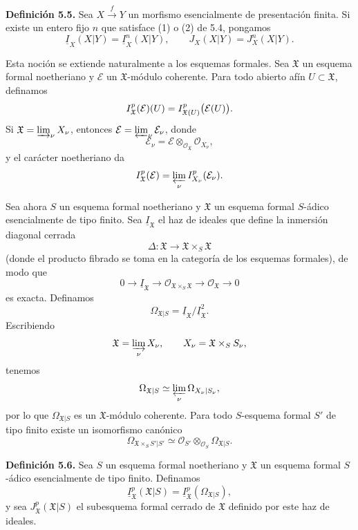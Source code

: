 \par\medskip
\noindent\textbf{Definición 5.5.}
Sea $X\xrightarrow{f}Y$ un morfismo esencialmente de presentación
finita. Si existe un entero fijo $n$ que satisface (1) o (2) de 5.4,
pongamos
\[
\underline I_X(X|Y)=\underline I_X^n(X|Y),
\qquad
J_X(X|Y)=J_X^n(X|Y).
\]


Esta noción se extiende naturalmente a los esquemas formales. Sea
$\mathfrak X$ un esquema formal noetheriano y $\mathcal E$ un
$\mathfrak X$-módulo coherente. Para todo abierto afín
$U\subset\mathfrak X$, definamos
\[
\underline I_{\mathfrak X}^{\sisi{P}{p}}(\mathcal E)(U)
=I_{\mathfrak X(U)}^{\sisi{P}{p}}\bigl(\mathcal E(U)\bigr).
\]
Si $\mathfrak X=\varinjlim_\nu X_\nu$, entonces
$\mathcal E=\varprojlim_\nu\mathcal E_\nu$, donde
\[
\mathcal E_\nu
=\mathcal E\otimes_{\mathcal O_{\mathfrak X}}\mathcal O_{X_\nu},
\]
y el carácter noetheriano da
\[
\underline I_{\mathfrak X}^{\sisi{P}{p}}(\mathcal E)
=\varprojlim_\nu\underline I_{X_\nu}^{\sisi{P}{p}}(\mathcal E_\nu).
\]

Sea ahora $S$ un esquema formal noetheriano y $\mathfrak X$ un
esquema formal $S$-ádico esencialmente de tipo finito. Sea
$\underline I_{\mathfrak X}$ el haz de ideales que define la
inmersión diagonal cerrada
\[
\Delta:\mathfrak X\longrightarrow
\mathfrak X\times_S\mathfrak X
\]
(donde el producto fibrado se toma en la categoría de los esquemas
formales), de modo que
\[
0\longrightarrow\underline I_{\mathfrak X}
\longrightarrow\mathcal O_{\mathfrak X\times_S\mathfrak X}
\longrightarrow\mathcal O_{\mathfrak X}\longrightarrow0
\]
es exacta. Definamos
\[
\Omega_{\mathfrak X|S}
=\underline I_{\mathfrak X}/\underline I_{\mathfrak X}^{2}.
\]
Escribiendo
\[
\mathfrak X=\varinjlim_\nu X_\nu,
\qquad X_\nu=\mathfrak X\times_SS_\nu,
\]
tenemos
\[
\Omega_{\mathfrak X|S}
\simeq\varprojlim_\nu\Omega_{X_\nu|S_\nu},
\]
por lo que $\Omega_{\mathfrak X|S}$ es un $\mathfrak X$-módulo
coherente. Para todo $S$-esquema formal $S'$ de tipo finito existe un
isomorfismo canónico
\[
\Omega_{\mathfrak X\times_SS'|S'}
\simeq
\mathcal O_{S'}\otimes_{\mathcal O_S}\Omega_{\mathfrak X|S}.
\]

\medskip
\noindent\textbf{Definición 5.6.}
Sea $S$ un esquema formal noetheriano y $\mathfrak X$ un esquema
formal $S$-ádico esencialmente de tipo finito. Definamos
\[
\underline I_{\mathfrak X}^p(\mathfrak X|S)
=\underline I_{\mathfrak X}^p(\Omega_{\mathfrak X|S}),
\]
y sea $J_{\mathfrak X}^p(\mathfrak X|S)$ el subesquema formal cerrado
de $\mathfrak X$ definido por este haz de ideales.

